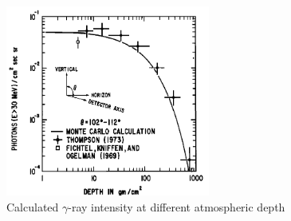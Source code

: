 \begin{figure}[h!]
    \centering
    \includegraphics[width=0.6\textwidth]{content/literature_review/figures/morris_photon_vs_depth}
    \caption{
        Calculated $\gamma$-ray intensity
        at different atmospheric depth
        \citep{Morris84}
    }
    \label{fig:emit_photon_vs_depth}
\end{figure}



